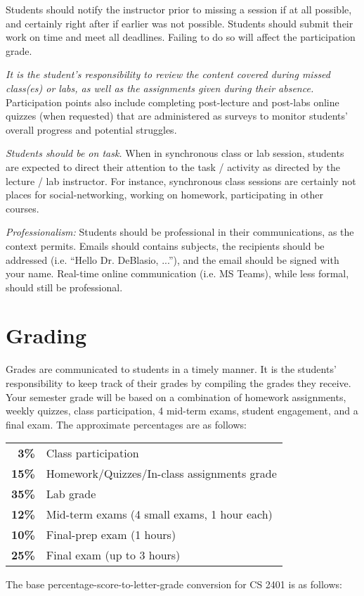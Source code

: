\documentclass[12pt]{scrartcl}
\begin{document}
Students should notify the instructor prior to missing a session if at all possible, and certainly right after if earlier was not possible. 
Students should submit their work on time and meet all deadlines. Failing to do so will affect the participation grade.


\textit{It is the student's responsibility to review the content covered during missed class(es) or labs, as well as the assignments given during their absence.}
Participation points also include completing post-lecture and post-labs online quizzes (when requested) that are administered as surveys to monitor students’ overall progress and potential struggles.

\textit{Students should be on task.} 
When in synchronous class or lab session, students are expected to direct their attention to the task / activity as directed by the lecture / lab instructor. 
For instance, synchronous class sessions are certainly not places for social-networking, working on homework, participating in other courses.

\textit{Professionalism:} 
Students should be professional in their communications, as the context permits.
Emails should contains subjects, the recipients should be addressed (i.e. ``Hello Dr. DeBlasio, ...''), and the email should be signed with your name. 
Real-time online communication (i.e. MS Teams), while less formal, should still be professional. 


\section{Grading}

Grades are communicated to students in a timely manner. 
It is the students’ responsibility to keep track of their grades by compiling the grades they receive. 
Your semester grade will be based on a combination of homework assignments, weekly quizzes, class participation, 4 mid-term exams, student engagement, and a final exam. 
The approximate percentages are as follows:
\begin{center}
\begin{tabular}{rl}
\textbf{3\% } & Class participation \\
\textbf{15\% } & Homework/Quizzes/In-class assignments grade\\
\textbf{35\% } & Lab grade\\
\textbf{12\% } & Mid-term exams (4 small exams, 1 hour each) \\
\textbf{10\% } & Final-prep exam (1 hours)\\
\textbf{25\% } & Final exam (up to 3 hours)\\
\end{tabular}
\end{center}
The base percentage-score-to-letter-grade conversion for CS 2401 is as follows: 
\end{document}
